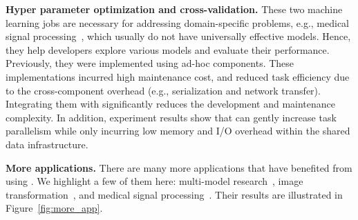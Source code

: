 \textbf{Hyper parameter optimization and cross-validation.}
These two machine learning jobs are necessary for addressing domain-specific problems, 
e.g., medical signal processing~\cite{deepsleepnet2017}, which usually
do not have universally effective models. Hence, they
help developers explore various models and evaluate their performance.
Previously, they were implemented using ad-hoc components. These implementations incurred high maintenance cost, 
and reduced task efficiency due to the cross-component overhead (e.g., serialization and network transfer).
Integrating them with \tl significantly reduces the development and maintenance complexity. 
In addition, experiment results show that \tl can gently increase task parallelism while only incurring
low memory and I/O overhead within the shared data infrastructure. 



\textbf{More applications.}
There are many more applications that have benefited from using \tl. We highlight a few of them here:
multi-model research~\cite{i2t2i2017}, image transformation~\cite{unsupim2im2017, myiccv2017}, and medical signal processing~\cite{braintumor2017, deepsleepnet2017}.
Their results are illustrated in Figure~\ref{fig:more_app}.






